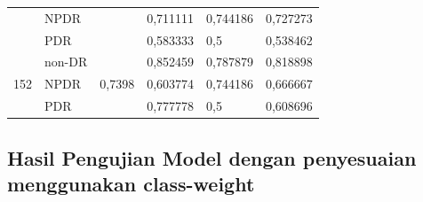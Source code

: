 \begin{table}[H]
\begin{center}
\begin{tabular}{clclll}
                                  & NPDR                      &                         & 0,711111                 & 0,744186                & 0,727273               \\ 
                                  & PDR                       &                         & 0,583333                 & 0,5                     & 0,538462               \\ \cline{1-6}
            \multirow{3}{*}{152}  & non-DR                    & \multirow{3}{*}{0,7398} & 0,852459                 & 0,787879                & 0,818898               \\
                                  & NPDR                      &                         & 0,603774                 & 0,744186                & 0,666667               \\
                                  & PDR                       &                         & 0,777778                 & 0,5                     & 0,608696               \\ \cline{1-6}
            \end{tabular}
        \end{center}
    \end{table}


\subsection{Hasil Pengujian Model dengan penyesuaian menggunakan class-weight}

